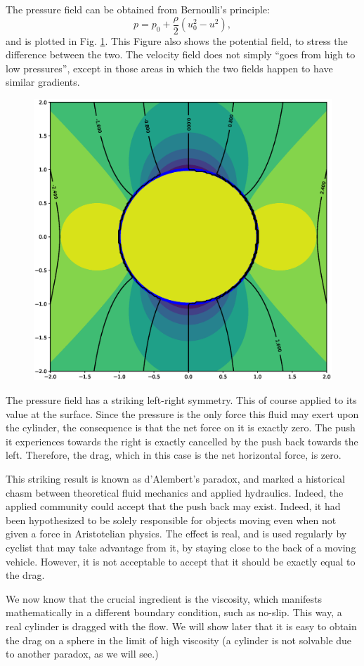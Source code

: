 The pressure field can be obtained from Bernoulli's principle:
\[
p= p_0 +  \frac{\rho}2  \left(u_0^2 - u^2 \right) ,
\]
and is plotted in
Fig. \ref{fig:potential_flow_past_cylinder_phi_p}. This Figure also
shows the potential field, to stress the difference between the
two. The velocity field does not simply ``goes from high to low
pressures'', except in those areas in which the two fields happen to
have similar gradients.

\begin{figure}
  \centering
  \includegraphics[width=0.4\linewidth]{figures/potential_flow_past_cylinder_phi_p}
  \caption{\label{fig:potential_flow_past_cylinder_phi_p}}
\end{figure}

The pressure field has a striking left-right symmetry. This of course
applied to its value at the surface. Since the pressure is the only
force this fluid may exert upon the cylinder, the consequence is that
the net force on it is exactly zero. The push it experiences towards
the right is exactly cancelled by the push back towards the
left. Therefore, the drag, which in this case is the net horizontal
force, is zero.

This striking result is known as d'Alembert's paradox, and marked a
historical chasm between theoretical fluid mechanics and applied
hydraulics. Indeed, the applied community could accept that the push
back may exist. Indeed, it had been hypothesized to be solely
responsible for objects moving even when not given a force in
Aristotelian physics. The effect is real, and is used regularly by
cyclist that may take advantage from it, by staying close to the back
of a moving vehicle. However, it is not acceptable to accept that it
should be exactly equal to the drag.

We now know that the crucial ingredient is the viscosity, which
manifests mathematically in a different boundary condition, such as
no-slip. This way, a real cylinder is dragged with the flow. We will
show later that it is easy to obtain the drag on a sphere in the limit
of high viscosity (a cylinder is not solvable due to another paradox,
as we will see.)

